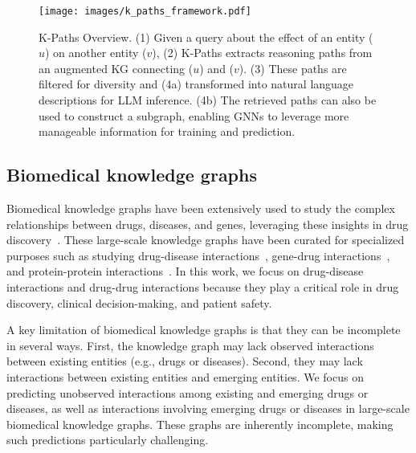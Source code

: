 \newcommand{\heading}[1]{\smallskip\noindent\textbf{#1}\enspace}


\begin{figure*}[t]
    \centering
    \texttt{[image: images/k\_paths\_framework.pdf]} 
    \caption{K-Paths Overview. (1) Given a query about the effect of an entity ($u$) on another entity ($v$), (2) K-Paths extracts reasoning paths from an augmented KG connecting ($u$) and ($v$). (3) These paths are filtered for diversity and (4a) transformed into natural language descriptions for LLM inference. (4b) The retrieved paths can also be used to construct a subgraph, enabling GNNs to leverage more manageable information for training and prediction.}
    \label{fig:pipeline-overview}
\end{figure*}



\subsection{Biomedical knowledge graphs}
Biomedical knowledge graphs have been extensively used to study the complex relationships between drugs, diseases, and genes, leveraging these insights in drug discovery~\citep{zitnik2018modeling, huang2024foundation, yu2021sumgnn, wang2024accurate}. 
These large-scale knowledge graphs have been curated for specialized purposes such as studying drug-disease interactions~\citep{wishart2018drugbank,hetionet2017}, gene-drug interactions~\citep{WhirlCarrillo2021}, and protein-protein interactions~\citep{gao2023hierarchical,jha2022prediction}.
In this work, we focus on drug-disease interactions and drug-drug interactions because they play a critical role in drug discovery, clinical decision-making, and patient safety.

A key limitation of biomedical knowledge graphs is that they can be incomplete in several ways.
First, the knowledge graph may lack observed interactions between existing entities (e.g., drugs or diseases). 
Second, they may lack interactions between existing entities and emerging entities. 
We focus on predicting unobserved interactions among existing and emerging drugs or diseases, as well as interactions involving emerging drugs or diseases in large-scale biomedical knowledge graphs. 
These graphs are inherently incomplete, making such predictions particularly challenging.

